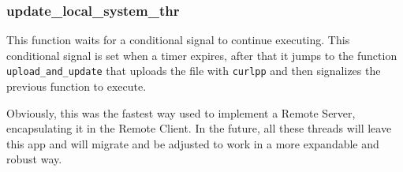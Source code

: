 \subsubsection{update\_local\_system\_thr}
This function waits for a conditional signal to continue executing. This conditional signal is set when a timer expires, after that it jumps to the function \texttt{upload\_and\_update} that uploads the file with \texttt{curlpp} and then signalizes the previous function to execute.
%
%

Obviously, this was the fastest way used to implement a Remote Server,
encapsulating it in the Remote Client. In the future, all these threads will
leave this app and will migrate and be adjusted to work in a more expandable and
robust way.
